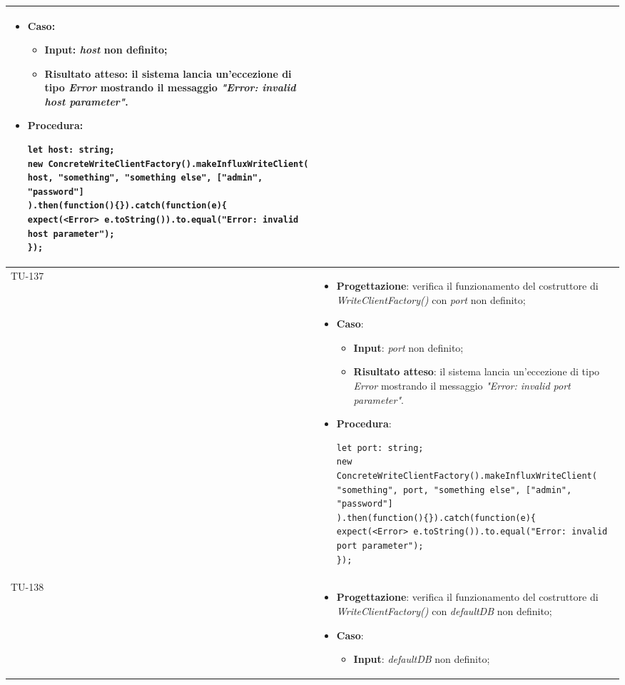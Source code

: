 \begin{longtable}{|C{1.5cm}|C{14.5cm}|}
\begin{itemize}
	\item \textbf{Caso}: 
	\begin{itemize}
		\item \textbf{Input}: \emph{host} non definito;
		\item \textbf{Risultato atteso}: il sistema lancia un'eccezione di tipo \emph{Error} mostrando il messaggio \emph{"Error: invalid host parameter"}.
	\end{itemize}
	\item \textbf{Procedura}:
	\begin{lstlisting}
let host: string;
new ConcreteWriteClientFactory().makeInfluxWriteClient(
host, "something", "something else", ["admin", "password"]
).then(function(){}).catch(function(e){
expect(<Error> e.toString()).to.equal("Error: invalid host parameter");
});
	\end{lstlisting}
\end{itemize}\\
\hline
{TU-137} &
\begin{itemize}
	\item \textbf{Progettazione}: verifica il funzionamento del costruttore di \emph{WriteClientFactory()} con \emph{port} non definito;
	\item \textbf{Caso}: 
	\begin{itemize}
		\item \textbf{Input}: \emph{port} non definito;
		\item \textbf{Risultato atteso}: il sistema lancia un'eccezione di tipo \emph{Error} mostrando il messaggio \emph{"Error: invalid port parameter"}.
	\end{itemize}
	\item \textbf{Procedura}:
	\begin{lstlisting}
let port: string;
new ConcreteWriteClientFactory().makeInfluxWriteClient(
"something", port, "something else", ["admin", "password"]
).then(function(){}).catch(function(e){
expect(<Error> e.toString()).to.equal("Error: invalid port parameter");
});
	\end{lstlisting}
\end{itemize}\\
\hline
{TU-138} &
\begin{itemize}
	\item \textbf{Progettazione}: verifica il funzionamento del costruttore di \emph{WriteClientFactory()} con \emph{defaultDB} non definito;
	\item \textbf{Caso}: 
	\begin{itemize}
		\item \textbf{Input}: \emph{defaultDB} non definito;

\end{itemize}
\end{itemize}
\end{longtable}
